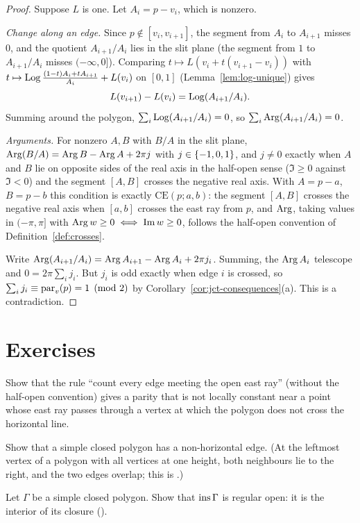 \begin{proof}
Suppose $L$ is one. Let $A_i=p-v_i$, which is nonzero.

\emph{Change along an edge.} Since $p\notin[v_i,v_{i+1}]$, the segment from $A_i$ to $A_{i+1}$
misses $0$, and the quotient $A_{i+1}/A_i$ lies in the slit plane (the segment from $1$ to
$A_{i+1}/A_i$ misses $(-\infty,0]$). Comparing $t\mapsto L(v_i+t(v_{i+1}-v_i))$ with
$t\mapsto\operatorname{Log}\frac{(1-t)A_i+tA_{i+1}}{A_i}+L(v_i)$ on $[0,1]$ (Lemma~\ref{lem:log-unique}) gives
\[
L(v_{i+1})-L(v_i)=\operatorname{Log}(A_{i+1}/A_i).
\]
Summing around the polygon, $\sum_i\operatorname{Log}(A_{i+1}/A_i)=0$, so $\sum_i\operatorname{Arg}(A_{i+1}/A_i)=0$.

\emph{Arguments.} For nonzero $A,B$ with $B/A$ in the slit plane,
$\operatorname{Arg}(B/A)=\operatorname{Arg} B-\operatorname{Arg} A+2\pi j$ with $j\in\left\{ -1,0,1 \right\}$, and $j\neq0$ exactly when $A$ and $B$ lie on
opposite sides of the real axis in the half-open sense ($\Im\ge0$ against $\Im<0$) and the segment
$[A,B]$ crosses the negative real axis. With $A=p-a$, $B=p-b$ this condition is exactly
$\mathrm{CE}(p;a,b)$: the segment $[A,B]$ crosses the negative real axis when $[a,b]$ crosses the east
ray from $p$, and $\operatorname{Arg}$, taking values in $(-\pi,\pi]$ with $\operatorname{Arg} w\ge0\iff\operatorname{Im} w\ge0$, follows the
half-open convention of Definition~\ref{def:crosses}.

Write $\operatorname{Arg}(A_{i+1}/A_i)=\operatorname{Arg} A_{i+1}-\operatorname{Arg} A_i+2\pi j_i$. Summing, the $\operatorname{Arg} A_i$ telescope and
$0=2\pi\sum_ij_i$. But $j_i$ is odd exactly when edge $i$ is crossed, so
$\sum_ij_i\equiv\operatorname{par}_v(p)=1\pmod2$ by Corollary~\ref{cor:jct-consequences}(a). This is a
contradiction.
\end{proof}


\section*{Exercises}

\begin{exercise}
Show that the rule ``count every edge meeting the open east ray'' (without the half-open convention)
gives a parity that is not locally constant near a point whose east ray passes through a vertex at
which the polygon does not cross the horizontal line.
\end{exercise}

\begin{exercise}
Show that a simple closed polygon has a non-horizontal edge. (At the leftmost vertex of a
polygon with all vertices at one height, both neighbours lie to the right, and the two edges
overlap; this is .)
\end{exercise}

\begin{exercise}
Let $\Gamma$ be a simple closed polygon. Show that $\operatorname{ins}\Gamma$ is regular open: it is the interior
of its closure ().
\end{exercise}
